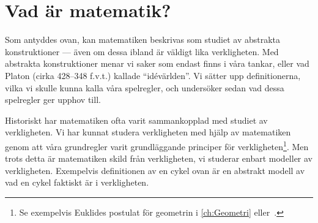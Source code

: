 \section{Vad är matematik?}
Som antyddes ovan, kan matematiken beskrivas som studiet av abstrakta 
konstruktioner --- även om dessa ibland är väldigt lika verkligheten.
Med abstrakta konstruktioner menar vi saker som endast finns i våra tankar, 
eller vad Platon (cirka 428--348 f.v.t.) kallade \enquote{idévärlden}.
Vi sätter upp definitionerna, vilka vi skulle kunna kalla våra spelregler, och 
undersöker sedan vad dessa spelregler ger upphov till.

Historiskt har matematiken ofta varit sammankopplad med studiet av
verkligheten.
Vi har kunnat studera verkligheten med hjälp av matematiken genom att våra
grundregler varit grundläggande principer för verkligheten\footnote{%
  Se exempelvis Euklides postulat för geometrin i \cref{ch:Geometri} eller~\cite[kap.\ 4]{Kline1990mtf1}.
}.
Men trots detta är matematiken skild från verkligheten, vi studerar enbart 
modeller av verkligheten.
Exempelvis definitionen av en cykel ovan är en abstrakt modell av vad en cykel 
faktiskt är i verkligheten.

